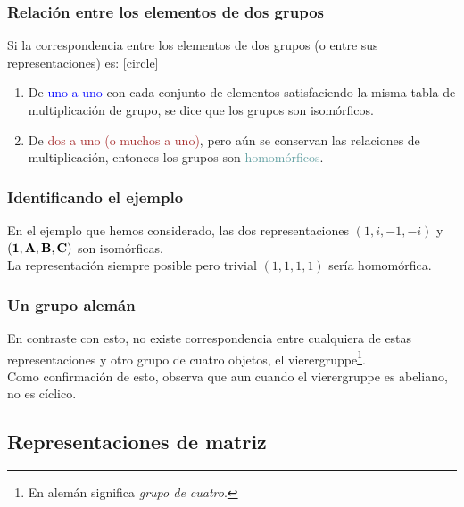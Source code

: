 \documentclass[12pt]{beamer}
\begin{document}
\begin{frame}
\frametitle{Relación entre los elementos de dos grupos}
Si la correspondencia entre los elementos de dos grupos (o entre sus representaciones) es:
\pause
{}
[circle]
\begin{enumerate}[<+->]
\item De \textcolor{blue}{uno a uno} con cada conjunto de elementos satisfaciendo la misma tabla de multiplicación de grupo, \pause se dice que los grupos son \textcolor{alizarin}{isomórficos}. \pause
\item De \textcolor{brown}{dos a uno (o muchos a uno)}, pero aún se conservan las relaciones de multiplicación, \pause entonces los grupos son \textcolor{cadetblue}{homomórficos}.
\end{enumerate}
\end{frame}
\begin{frame}
\frametitle{Identificando el ejemplo}
En el ejemplo que hemos considerado, las dos representaciones $(1, i, -1, -i)$ y $(\vb{1}, \vb{A}, \vb{B}, \vb{C})$ son isomórficas.
\\
\bigskip
\pause
La representación siempre posible pero trivial $(1, 1, 1, 1)$ sería homomórfica.
\end{frame}
\begin{frame}
\frametitle{Un grupo alemán}
En contraste con esto, no existe correspondencia entre cualquiera de estas representaciones y otro grupo de cuatro objetos, el vierergruppe\footnote{En alemán significa \emph{grupo de cuatro}.}.
\\
\bigskip
\pause
Como confirmación de esto, observa que aun cuando el vierergruppe es abeliano, no es cíclico.
\end{frame}

\subsection{Representaciones de matriz}
\end{document}
